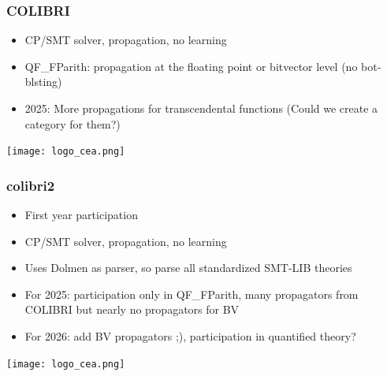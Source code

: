 \documentclass[table]{beamer}
\begin{document}
\newcommand{\myvideopdf}[2]{
\begin{frame}
  \frametitle{#1}
  \begin{center}
    video: \texttt{#2}
  \end{center}
\end{frame}
}


\begin{frame}
  \frametitle{COLIBRI}

  \begin{itemize}
    \item CP/SMT solver, propagation, no learning
    \item QF\_FParith: propagation at the floating point or bitvector level (no bot-blsting)
    \item 2025: More propagations for transcendental functions (Could we create a category for them?)
    \end{itemize}
    \vfill
    \texttt{[image: logo\_cea.png]}
\end{frame}



\begin{frame}
  \frametitle{colibri2}

  \begin{itemize}
    \item First year participation
    \item CP/SMT solver, propagation, no learning
    \item Uses Dolmen as parser, so parse all standardized SMT-LIB theories
    \item For 2025: participation only in QF\_FParith, many propagators from COLIBRI but nearly no propagators for BV
    \item For 2026: add BV propagators ;), participation in quantified theory?
    \end{itemize}
    \vfill
    \texttt{[image: logo\_cea.png]}
\end{frame}





\end{document}
